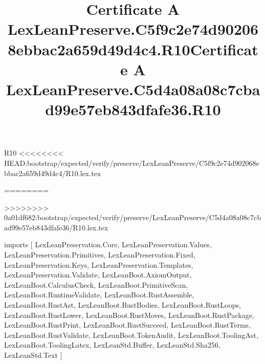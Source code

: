 \begin{lexlean}{R10}
<<<<<<<< HEAD:bootstrap/expected/verify/preserve/LexLeanPreserve/C5f9c2e74d902068ebbac2a659d49d4c4/R10.lex.tex
\title{Certificate A LexLeanPreserve.C5f9c2e74d902068ebbac2a659d49d4c4.R10}
========
\title{Certificate A LexLeanPreserve.C5d4a08a08c7cbad99e57eb843dfafe36.R10}
>>>>>>>> 0a01df682:bootstrap/expected/verify/preserve/LexLeanPreserve/C5d4a08a08c7cbad99e57eb843dfafe36/R10.lex.tex
\begin{coremodule}
imports [
  LexLeanPreservation.Core,
  LexLeanPreservation.Values,
  LexLeanPreservation.Primitives,
  LexLeanPreservation.Fixed,
  LexLeanPreservation.Keys,
  LexLeanPreservation.Templates,
  LexLeanPreservation.Validate,
  LexLeanBoot.AxiomOutput,
  LexLeanBoot.CalculusCheck,
  LexLeanBoot.PrimitiveScan,
  LexLeanBoot.RuntimeValidate,
  LexLeanBoot.RustAssemble,
  LexLeanBoot.RustAst,
  LexLeanBoot.RustBodies,
  LexLeanBoot.RustLoops,
  LexLeanBoot.RustLower,
  LexLeanBoot.RustMoves,
  LexLeanBoot.RustPackage,
  LexLeanBoot.RustPrint,
  LexLeanBoot.RustSucceed,
  LexLeanBoot.RustTerms,
  LexLeanBoot.RustValidate,
  LexLeanBoot.TokenAudit,
  LexLeanBoot.ToolingAst,
  LexLeanBoot.ToolingLatex,
  LexLeanStd.Buffer,
  LexLeanStd.Sha256,
  LexLeanStd.Text
]


\end{coremodule}
\end{lexlean}
